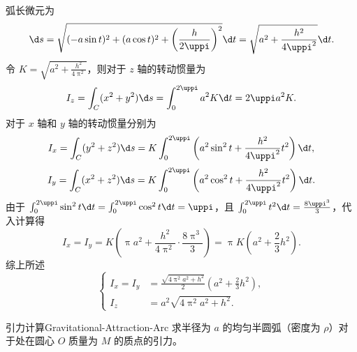 \begin{solution}
    弧长微元为
    \begin{equation}
        \d s = \sqrt{(-a \sin t)^2 + (a \cos t)^2 + \left(\frac{h}{2\uppi}\right)^2} \d t = \sqrt{a^2 + \frac{h^2}{4\uppi^2}} \d t.
    \end{equation}
    令 $K = \sqrt{a^2 + \frac{h^2}{4\uppi^2}}$，则对于 $z$ 轴的转动惯量为
    \begin{equation}
        I_z = \int_{C} (x^2 + y^2) \d s = \int_{0}^{2\uppi} a^2 K \d t = 2\uppi a^2 K.
    \end{equation}
    对于 $x$ 轴和 $y$ 轴的转动惯量分别为
    \begin{equation}
        I_x = \int_{C} (y^2 + z^2) \d s = K \int_{0}^{2\uppi} \left( a^2 \sin^2 t + \frac{h^2}{4\uppi^2} t^2 \right) \d t,
    \end{equation}
    \begin{equation}
        I_y = \int_{C} (x^2 + z^2) \d s = K \int_{0}^{2\uppi} \left( a^2 \cos^2 t + \frac{h^2}{4\uppi^2} t^2 \right) \d t.
    \end{equation}
    由于 $\int_{0}^{2\uppi} \sin^2 t \d t = \int_{0}^{2\uppi} \cos^2 t \d t = \uppi$，且 $\int_{0}^{2\uppi} t^2 \d t = \frac{8\uppi^3}{3}$，代入计算得
    \begin{equation}
        I_x = I_y = K \left( \uppi a^2 + \frac{h^2}{4\uppi^2} \cdot \frac{8\uppi^3}{3} \right) = \uppi K \left( a^2 + \frac{2}{3}h^2 \right).
    \end{equation}
    综上所述
    \begin{equation}
        \boxed{\left\{ \begin{aligned} I_x = I_y &= \frac{\sqrt{4\uppi^2 a^2 + h^2}}{2} \left( a^2 + \frac{2}{3}h^2 \right), \\ I_z &= a^2 \sqrt{4\uppi^2 a^2 + h^2}. \end{aligned} \right.}
    \end{equation}
\end{solution}

\begin{problem}{引力计算}{Gravitational-Attraction-Arc}
    求半径为 $a$ 的均匀半圆弧（密度为 $\rho$）对于处在圆心 $O$ 质量为 $M$ 的质点的引力。
\end{problem}

